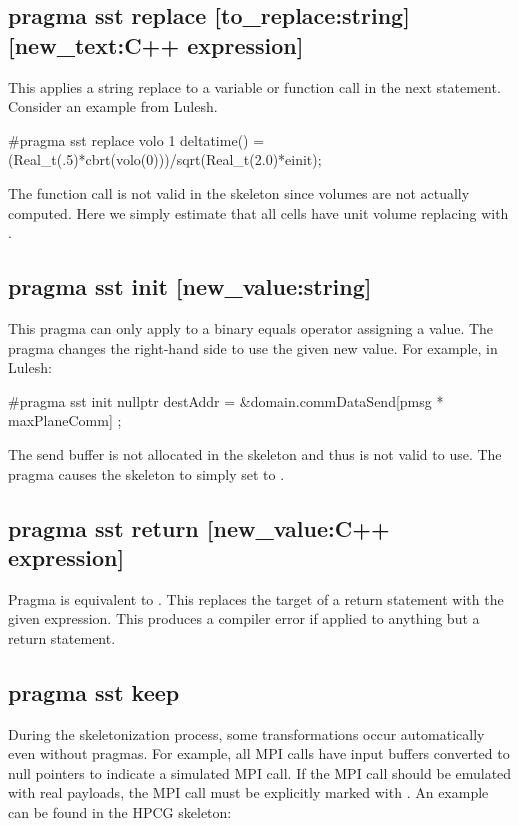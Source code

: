 \subsection{pragma sst replace [to\_replace:string] [new\_text:C++ expression]}
This applies a string replace to a variable or function call in the next statement.
Consider an example from Lulesh.

\begin{CppCode}
#pragma sst replace volo 1
   deltatime() = (Real_t(.5)*cbrt(volo(0)))/sqrt(Real_t(2.0)*einit);
\end{CppCode}
The function call  is not valid in the skeleton since volumes are not actually computed.
Here we simply estimate that all cells have unit volume replacing  with .

\subsection{pragma sst init [new\_value:string]}
This pragma can only apply to a binary equals operator assigning a value.
The pragma changes the right-hand side to use the given new value.
For example, in Lulesh:

\begin{CppCode}
#pragma sst init nullptr
  destAddr = &domain.commDataSend[pmsg * maxPlaneComm] ;
\end{CppCode}
The send buffer  is not allocated in the skeleton and thus is not valid to use.
The pragma causes the skeleton to simply set  to .

\subsection{pragma sst return [new\_value:C++ expression]}
Pragma is equivalent to . This replaces the target of a return statement with the given expression.
This produces a compiler error if applied to anything but a return statement.

\subsection{pragma sst keep}
During the skeletonization process, some transformations occur automatically even without pragmas. 
For example, all MPI calls have input buffers converted to null pointers to indicate a simulated MPI call.
If the MPI call should be emulated with real payloads, the MPI call must be explicitly marked with .
An example can be found in the HPCG skeleton:

